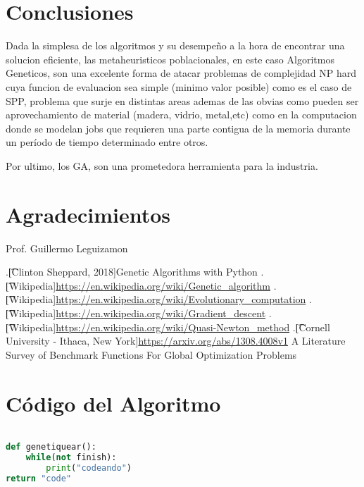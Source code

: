 \documentclass[10pt]{article}
\begin{document}
\section{Conclusiones}
Dada la simplesa de los algoritmos y su desempeño a la hora de encontrar una solucion eficiente, las metaheuristicos poblacionales, en este caso Algoritmos Geneticos, son una excelente forma de atacar problemas de complejidad NP hard cuya funcion de evaluacion sea simple (minimo valor posible) como es el caso de SPP, problema que surje en distintas areas ademas de las obvias como pueden ser aprovechamiento de material (madera, vidrio, metal,etc) como en la computacion donde se modelan jobs que requieren una parte contigua de la memoria durante un período de tiempo determinado entre otros.

Por ultimo, los GA, son una prometedora herramienta para la industria.

\section*{Agradecimientos}
Prof. Guillermo Leguizamon


\begin{thebibliography}{99} %
.\t[Clinton Sheppard, 2018]{}Genetic Algorithms with Python
.\t[Wikipedia]{}\url{https://en.wikipedia.org/wiki/Genetic_algorithm}
.\t[Wikipedia]{}\url{https://en.wikipedia.org/wiki/Evolutionary_computation}
.\t[Wikipedia]{}\url{https://en.wikipedia.org/wiki/Gradient_descent}
.\t[Wikipedia]{}\url{https://en.wikipedia.org/wiki/Quasi-Newton_method}
.\t[Cornell University - Ithaca, New York]{}\url{https://arxiv.org/abs/1308.4008v1} A Literature Survey of Benchmark Functions For Global Optimization Problems




\end{thebibliography} 
 
\section{Código del Algoritmo}
\begin{lstlisting}[language=Python]

def genetiquear():
	while(not finish):
		print("codeando")
return "code"

\end{lstlisting}
\newpage
\tableofcontents
\end{document}
